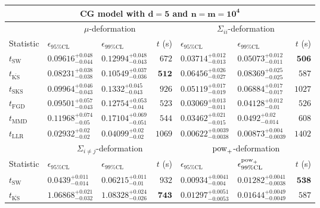 \begin{tabular}{l|llr|llr}
	\toprule
	\multicolumn{7}{c}{{\bf CG model with $\mathbf{d=5}$ and $\mathbf{n=m=10^{4}}$}} \\
	\toprule
	\multicolumn{1}{c}{} & \multicolumn{3}{c}{$\mu$-deformation} & \multicolumn{3}{c}{$\Sigma_{ii}$-deformation} \\
	Statistic & $\epsilon_{95\%\mathrm{CL}}$ & $\epsilon_{99\%\mathrm    {CL}}$ & $t$ (s) & $\epsilon_{95\%\mathrm{CL}}$ & $\epsilon_{99\%\mathrm{CL}}$ & $t$ (s) \\
	\midrule
	$t_{\mathrm{SW}}$ & $0.09616_{-0.044}^{+0.048}$ & $0.12994_{-0.043}^{+0.048}$ & $672$ & $0.03714_{-0.013}^{+0.012}$ & $0.05073_{-0.011}^{+0.012}$ & ${\mathbf{506}}$ \\
	$t_{\overline{\mathrm{KS}}}$ & ${\mathbf{0.08231_{-0.038}^{+0.038}}}$ & ${\mathbf{0.10549_{-0.036}^{+0.037}}}$ & ${\mathbf{512}}$ & $0.06456_{-0.027}^{+0.026}$ & $0.08369_{-0.025}^{+0.025}$ & $587$ \\
	$t_{\mathrm{SKS}}$ & $0.09964_{-0.043}^{+0.046}$ & $0.1332_{-0.043}^{+0.045}$ & $926$ & $0.05119_{-0.019}^{+0.017}$ & $0.06884_{-0.017}^{+0.017}$ & $1027$ \\
	$t_{\mathrm{FGD}}$ & $0.09501_{-0.043}^{+0.057}$ & $0.12754_{-0.04}^{+0.053}$ & $523$ & ${\mathbf{0.03069_{-0.011}^{+0.013}}}$ & ${\mathbf{0.04128_{-0.01}^{+0.012}}}$ & $526$ \\
	$t_{\mathrm{MMD}}$ & $0.11968_{-0.05}^{+0.074}$ & $0.17104_{-0.051}^{+0.069}$ & $544$ & $0.03462_{-0.015}^{+0.021}$ & $0.0492_{-0.014}^{+0.02}$ & $608$ \\
	$t_{\mathrm{LLR}}$ & $0.02932_{-0.02}^{+0.02}$ & $0.04099_{-0.02}^{+0.02}$ & $1069$ & $0.00622_{-0.0038}^{+0.0039}$ & $0.00873_{-0.0039}^{+0.004}$ & $1402$ \\
	\toprule
	\multicolumn{1}{c}{} & \multicolumn{3}{c}{$\Sigma_{i\neq j}$-deformation} & \multicolumn{3}{c}{$\rm{pow}_{+}$-deformation} \\
	Statistic & $\epsilon_{95\%\mathrm{CL}}$ & $\epsilon_{99\%\mathrm{CL}}$ & $t$ (s) & $\epsilon_{95\%\mathrm{CL}}$ & $\epsilon^{\rm   {pow}_{+}}_{99\%\mathrm{CL}}$ & $t$ (s) \\
	\midrule
	$t_{\mathrm{SW}}$ & $0.0439_{-0.014}^{+0.011}$ & $0.06215_{-0.01}^{+0.011}$ & $932$ & $0.00934_{-0.004}^{+0.0041}$ & $0.01282_{-0.0038}^{+0.0041}$ & ${\mathbf{538}}$ \\
	$t_{\overline{\mathrm{KS}}}$ & $1.06868_{-0.032}^{+0.021}$ & $1.08328_{-0.026}^{+0.024}$ & ${\mathbf{743}}$ & $0.01297_{-0.0053}^{+0.0051}$ & $0.01644_{-0.0049}^{+0.0049}$ & $587$ \\

\end{tabular}
